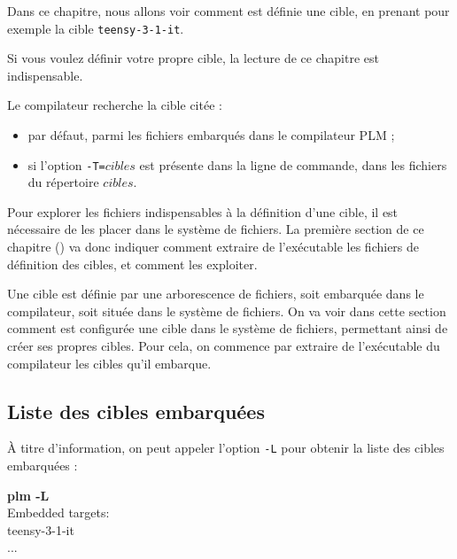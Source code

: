 





Dans ce chapitre, nous allons voir comment est définie une cible, en prenant pour exemple la cible \texttt{teensy-3-1-it}. 

Si vous voulez définir votre propre cible, la lecture de ce chapitre est indispensable. 

Le compilateur recherche la cible citée :
\begin{itemize}
  \item par défaut, parmi les fichiers embarqués dans le compilateur PLM ;
  \item si l'option \texttt{-T=$cibles$} est présente dans la ligne de commande, dans les fichiers du répertoire $cibles$.
\end{itemize}

Pour explorer les fichiers indispensables à la définition d'une cible, il est nécessaire de les placer dans le système de fichiers. La première section de ce chapitre () va donc indiquer comment extraire de l'exécutable les fichiers de définition des cibles, et comment les exploiter.



Une cible est définie par une arborescence de fichiers, soit embarquée dans le compilateur, soit située dans le système de fichiers. On va voir dans cette section comment est configurée une cible dans le système de fichiers, permettant ainsi de créer ses propres cibles. Pour cela, on commence par extraire de l'exécutable du compilateur les cibles qu'il embarque.

\subsection{Liste des cibles embarquées}
À titre d'information, on peut appeler l'option \texttt{-L} pour obtenir la liste des cibles embarquées :
\begin{SHELL}
{\bfseries plm -L}\\
Embedded targets:\\ 
\hspace*{1.2em}teensy-3-1-it\\
\hspace*{1.2em}...
\end{SHELL}

